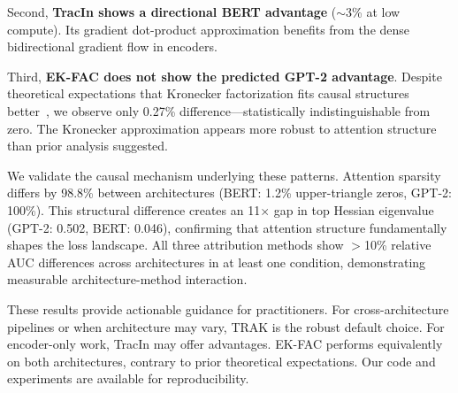 Second, \textbf{TracIn shows a directional BERT advantage} ($\sim$3\% at low compute). Its gradient dot-product approximation benefits from the dense bidirectional gradient flow in encoders.

Third, \textbf{EK-FAC does not show the predicted GPT-2 advantage}. Despite theoretical expectations that Kronecker factorization fits causal structures better~\cite{grosse2023studying}, we observe only 0.27\% difference---statistically indistinguishable from zero. The Kronecker approximation appears more robust to attention structure than prior analysis suggested.

We validate the causal mechanism underlying these patterns. Attention sparsity differs by 98.8\% between architectures (BERT: 1.2\% upper-triangle zeros, GPT-2: 100\%). This structural difference creates an 11$\times$ gap in top Hessian eigenvalue (GPT-2: 0.502, BERT: 0.046), confirming that attention structure fundamentally shapes the loss landscape. All three attribution methods show $>$10\% relative AUC differences across architectures in at least one condition, demonstrating measurable architecture-method interaction.

These results provide actionable guidance for practitioners. For cross-architecture pipelines or when architecture may vary, TRAK is the robust default choice. For encoder-only work, TracIn may offer advantages. EK-FAC performs equivalently on both architectures, contrary to prior theoretical expectations. Our code and experiments are available for reproducibility.
